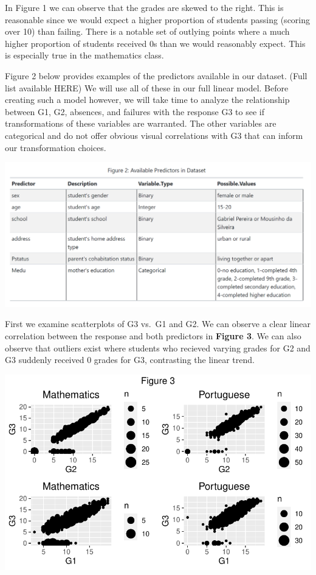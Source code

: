 \documentclass[
  letterpaper,
  DIV=11,
  numbers=noendperiod]{scrartcl}
\begin{document}
In Figure 1 we can observe that the grades are skewed to the right. This
is reasonable since we would expect a higher proportion of students
passing (scoring over 10) than failing. There is a notable set of
outlying points where a much higher proportion of students received 0s
than we would reasonably expect. This is especially true in the
mathematics class.

Figure 2 below provides examples of the predictors available in our
dataset. (Full list available HERE) We will use all of these in our full
linear model. Before creating such a model however, we will take time to
analyze the relationship between G1, G2, absences, and failures with the
response G3 to see if transformations of these variables are warranted.
The other variables are categorical and do not offer obvious visual
correlations with G3 that can inform our transformation choices.

\includegraphics{predictor_examples.png}

First we examine scatterplots of G3 vs.~G1 and G2. We can observe a
clear linear correlation between the response and both predictors in
\textbf{Figure 3}. We can also observe that outliers exist where
students who recieved varying grades for G2 and G3 suddenly received 0
grades for G3, contrasting the linear trend.

\includegraphics{Final_Paper_edit_files/figure-pdf/unnamed-chunk-2-1.pdf}
\end{document}
